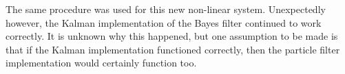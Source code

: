 The same procedure was used for this new non-linear system. Unexpectedly however,
the Kalman implementation of the Bayes filter continued to work correctly.
It is unknown why this happened, but one assumption to be made is that if the
Kalman implementation functioned correctly, then the particle filter implementation
would certainly function too.

